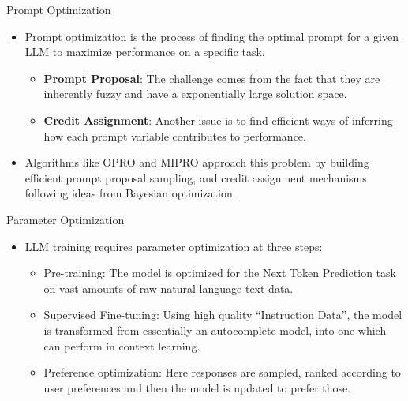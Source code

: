\documentclass{beamer}
\begin{document}
\begin{frame}{Prompt Optimization}
    \begin{itemize}
        \item Prompt optimization is the process of finding the optimal prompt for a given LLM to maximize performance on a specific task.
        \vspace{0.5em}
        \begin{itemize}
            \item \textbf{Prompt Proposal}: The challenge comes from the fact that they are inherently fuzzy and have a exponentially large solution space.
            \vspace{0.5em}
            \item \textbf{Credit Assignment}: Another issue is to find efficient ways of inferring how each prompt variable contributes to performance.
        \end{itemize}
        \item Algorithms like OPRO \citep{yang2024largelanguagemodelsoptimizers} and MIPRO \citep{opsahlong2024optimizinginstructionsdemonstrationsmultistage} approach this problem by building efficient prompt proposal sampling, and credit assignment mechanisms following ideas from Bayesian optimization.
    \end{itemize}
\end{frame}

\begin{frame}{Parameter Optimization}
    \begin{itemize}
        \item LLM training requires parameter optimization at three steps:
        \vspace{0.5em}
        \begin{itemize}
            \item Pre-training: The model is optimized for the Next Token Prediction task on vast amounts of raw natural language text data.
            \vspace{0.5em}
            \item Supervised Fine-tuning: Using high quality “Instruction Data”, the model is transformed from essentially an autocomplete model, into one which can perform in context learning.
            \vspace{0.5em}
            \item Preference optimization: Here responses are sampled, ranked according to user preferences and then the model is updated to prefer those.
        \end{itemize}
    \end{itemize}
\end{frame}
\end{document}
